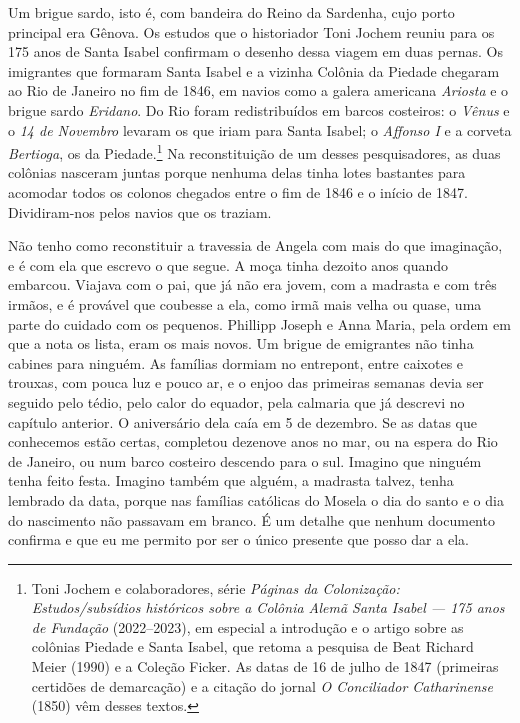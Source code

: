 \documentclass[
  brazilian,
  11pt,
  openany]{book}
\begin{document}
Um brigue sardo, isto é, com bandeira do Reino da Sardenha, cujo porto
principal era Gênova. Os estudos que o historiador Toni Jochem reuniu
para os 175 anos de Santa Isabel confirmam o desenho dessa viagem em
duas pernas. Os imigrantes que formaram Santa Isabel e a vizinha Colônia
da Piedade chegaram ao Rio de Janeiro no fim de 1846, em navios como a
galera americana \emph{Ariosta} e o brigue sardo \emph{Eridano}. Do Rio
foram redistribuídos em barcos costeiros: o \emph{Vênus} e o \emph{14 de
Novembro} levaram os que iriam para Santa Isabel; o \emph{Affonso I} e a
corveta \emph{Bertioga}, os da Piedade.\footnote{Toni Jochem e
  colaboradores, série \emph{Páginas da Colonização: Estudos/subsídios
  históricos sobre a Colônia Alemã Santa Isabel --- 175 anos de
  Fundação} (2022--2023), em especial a introdução e o artigo sobre as
  colônias Piedade e Santa Isabel, que retoma a pesquisa de Beat Richard
  Meier (1990) e a Coleção Ficker. As datas de 16 de julho de 1847
  (primeiras certidões de demarcação) e a citação do jornal \emph{O
  Conciliador Catharinense} (1850) vêm desses textos.} Na reconstituição
de um desses pesquisadores, as duas colônias nasceram juntas porque
nenhuma delas tinha lotes bastantes para acomodar todos os colonos
chegados entre o fim de 1846 e o início de 1847. Dividiram-nos pelos
navios que os traziam.

Não tenho como reconstituir a travessia de Angela com mais do que
imaginação, e é com ela que escrevo o que segue. A moça tinha dezoito
anos quando embarcou. Viajava com o pai, que já não era jovem, com a
madrasta e com três irmãos, e é provável que coubesse a ela, como irmã
mais velha ou quase, uma parte do cuidado com os pequenos. Phillipp
Joseph e Anna Maria, pela ordem em que a nota os lista, eram os mais
novos. Um brigue de emigrantes não tinha cabines para ninguém. As
famílias dormiam no entrepont, entre caixotes e trouxas, com pouca luz e
pouco ar, e o enjoo das primeiras semanas devia ser seguido pelo tédio,
pelo calor do equador, pela calmaria que já descrevi no capítulo
anterior. O aniversário dela caía em 5 de dezembro. Se as datas que
conhecemos estão certas, completou dezenove anos no mar, ou na espera do
Rio de Janeiro, ou num barco costeiro descendo para o sul. Imagino que
ninguém tenha feito festa. Imagino também que alguém, a madrasta talvez,
tenha lembrado da data, porque nas famílias católicas do Mosela o dia do
santo e o dia do nascimento não passavam em branco. É um detalhe que
nenhum documento confirma e que eu me permito por ser o único presente
que posso dar a ela.
\end{document}

